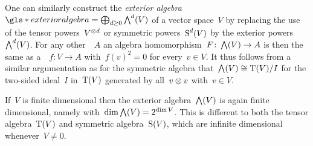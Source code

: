 \begin{remark}  %
  One can similarly construct the \emph{exterior algebra}~$\gls*{exterior algebra} = \bigoplus_{d \geq 0} \Exterior^d(V)$ of a vector space~$V$ by replacing the use of the tensor powers~$V^{\otimes d}$ or symmetric powers~$\operatorname{S}^d(V)$ by the exterior powers~$\bigwedge^d(V)$.
  For any other~{\algebra{$\kf$}}~$A$ an algebra homomorphism~$F \colon \bigwedge(V) \to A$ is then the same as a~{\linear{$\kf$}}~$f \colon V \to A$ with~$f(v)^2 = 0$ for every~$v \in V$.
  It thus follows from a similar argumentation as for the symmetric algebra that~$\bigwedge(V) \cong \operatorname{T}(V)/I$ for the two-sided ideal~$I$ in~$\operatorname{T}(V)$ generated by all~$v \otimes v$ with~$v \in V$.
  
  
  If~$V$ is finite dimensional then the exterior algebra~$\bigwedge(V)$ is again finite dimensional, namely with~$\dim \bigwedge(V) = 2^{\dim V}$.
  This is different to both the tensor algebra~$\operatorname{T}(V)$ and symmetric algebra~$\operatorname{S}(V)$, which are infinite dimensional whenever~$V \neq 0$.
\end{remark}




